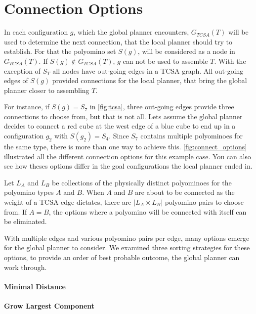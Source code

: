 \section{Connection Options}
\label{sec:connect_options}

In each configuration $g$, which the global planner encounters, $G_{TCSA}(T)$ will be used to determine the next connection, that the local planner should try to establish.
For that the polyomino set $S(g)$, will be considered as a node in $G_{TCSA}(T)$.
If $S(g) \notin G_{TCSA}(T)$, $g$ can not be used to assemble $T$.
With the exception of $S_T$ all nodes have out-going edges in a TCSA graph.
All out-going edges of $S(g)$ provided connections for the local planner, that bring the global planner closer to assembling $T$.

For instance, if $S(g) = S_7$ in \autoref{fig:tcsa}, three out-going edges provide three connections to choose from, but that is not all.
Lets assume the global planner decides to connect a red cube at the west edge of a blue cube to end up in a configuration $g_2$ with $S(g_2) = S_4$.
Since $S_7$ contains multiple polyominoes for the same type, there is more than one way to achieve this.
\autoref{fig:connect_options} illustrated all the different connection options for this example case.
You can also see how theses options differ in the goal configurations the local planner ended in.

Let $L_A$ and $L_B$ be collections of the physically distinct polyominoes for the polyomino types $A$ and $B$.
When $A$ and $B$ are about to be connected as the weight of a TCSA edge dictates, there are $\left| L_A \times L_B \right|$ polyomino pairs to choose from.
If $A = B$, the options where a polyomino will be connected with itself can be eliminated.

With multiple edges and various polyomino pairs per edge, many options emerge for the global planner to consider.
We examined three sorting strategies for these options, to provide an order of best probable outcome, the global planner can work through. 

\paragraph{Minimal Distance}

\paragraph{Grow Largest Component}


